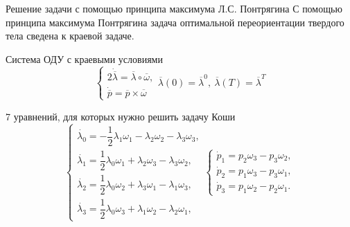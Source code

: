 \documentclass[10pt,utf8,presentation,notheorems,xcolor=dvipsnames,compress]{beamer}
\begin{document}
\begin{frame}[t]{Решение задачи с помощью принципа максимума Л.С. Понтрягина}
С помощью принципа максимума Понтрягина задача оптимальной переориентации твердого тела сведена к краевой задаче.
\begin{block}{Система ОДУ с краевыми условиями}
\begin{equation}
\begin{cases}
	2\dot{\overline{\lambda}} = \overline{\lambda} \circ \overline{\omega},\\
	\dot{\overline{\textit{p}}} = \overline{\textit{p}} \times \overline{\omega}
\end{cases}
\overline{\lambda}(0) = \overline{\lambda}^{0},\ \overline{\lambda}(\textit{T}) = \overline{\lambda}^{\textit{T}}
\end{equation}
\end{block}

\begin{block}{7 уравнений, для которых нужно решить задачу Коши}
\begin{equation}
\begin{cases}
\dot{\lambda_{0}} = -\dfrac{1}{2} \lambda_{1}\omega_{1} - \lambda_{2}\omega_{2} - \lambda_{3}\omega_{3},\\
\dot{\lambda_{1}} = \dfrac{1}{2} \lambda_{0}\omega_{1} + \lambda_{2}\omega_{3} - \lambda_{3}\omega_{2},\\
\dot{\lambda_{2}} = \dfrac{1}{2} \lambda_{0}\omega_{2} + \lambda_{3}\omega_{1} - \lambda_{1}\omega_{3},\\
\dot{\lambda_{3}} = \dfrac{1}{2} \lambda_{0}\omega_{3} + \lambda_{1}\omega_{2} - \lambda_{2}\omega_{1},
\end{cases}
\begin{cases}
\dot{\textit{p}}_1 = \textit{p}_2 \omega_3 - \textit{p}_3 \omega_2,\\
\dot{\textit{p}}_2 = \textit{p}_1 \omega_3 - \textit{p}_3 \omega_1,\\
\dot{\textit{p}}_3 = \textit{p}_1 \omega_2 - \textit{p}_2 \omega_1.
\end{cases}
\end{equation}
\end{block}
\end{frame}
\end{document}
